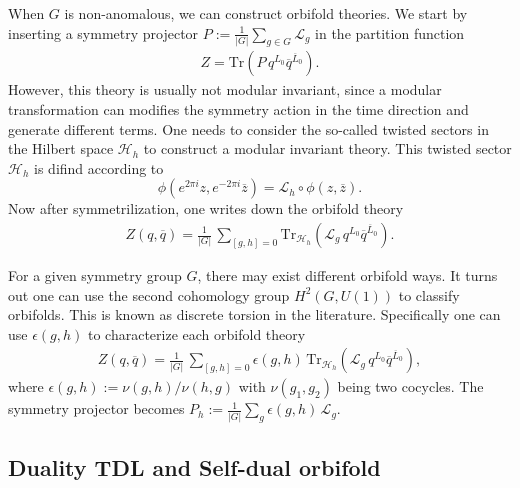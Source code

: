 When $G$ is non-anomalous, we can construct orbifold theories. We start by inserting a symmetry projector $P := \frac{1}{|G|} \sum_{g \in G} \mathcal{L}_g$ in the partition function 
\begin{equation}
	\begin{aligned}
		Z = \mathrm{Tr}\left( P\,q^{L_0} \overline{q}^{\overline{L}_0} \right).
	\end{aligned}
\end{equation}
However, this theory is usually not modular invariant, since a modular transformation can modifies the symmetry action in the time direction and generate different terms. One needs to consider the so-called twisted sectors in the Hilbert space $\mathcal{H}_h$ to construct a modular invariant theory. This twisted sector $\mathcal{H}_h$ is difind according to
\begin{equation}
	\phi(e^{2\pi i}z,e^{-2\pi i}\overline{z}) = \mathcal{L}_h \circ \phi(z,\overline{z}).
\end{equation}
Now after symmetrilization, one writes down the orbifold theory
\begin{equation}
	\begin{aligned}
		Z(q,\overline{q}) = \frac{1}{|G|}\,\sum_{[g,h]=0}\mathrm{Tr}_{\mathcal{H}_h}\left( \mathcal{L}_g \, q^{L_0} \overline{q}^{\overline{L}_0} \right).
	\end{aligned}
\end{equation}

For a given symmetry group $G$, there may exist different orbifold ways. It turns out one can use the second cohomology group $H^2(G,U(1))$ to classify orbifolds. This is known as discrete torsion in the literature. Specifically one can use $\epsilon(g,h)$ to characterize each orbifold theory
\begin{equation}
	\begin{aligned}
		Z(q,\overline{q}) = \frac{1}{|G|} \, \sum_{[g,h]=0} \epsilon(g,h) \, \mathrm{Tr}_{\mathcal{H}_h}\left( \mathcal{L}_g \, q^{L_0} \overline{q}^{\overline{L}_0} \right),
	\end{aligned}
\end{equation}
where $\epsilon(g,h) := \nu(g,h)/\nu(h,g)$ with $\nu(g_1,g_2)$ being two cocycles. The symmetry projector becomes $P_h := \frac{1}{|G|}\sum_g \epsilon(g,h)\,\mathcal{L}_g$. 

\subsection{Duality TDL and Self-dual orbifold}

